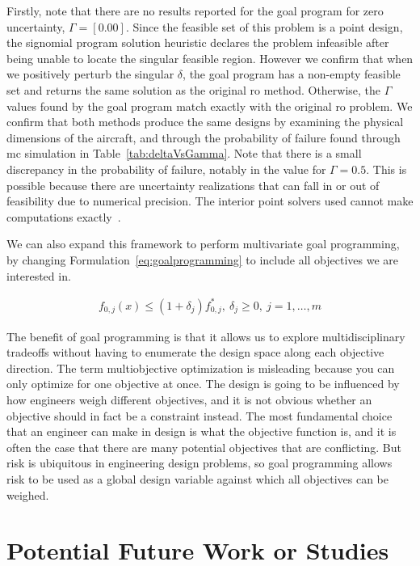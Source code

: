 Firstly, note that there are no results reported for the goal program
for zero uncertainty, $\Gamma = [0.00]$.
Since the feasible set of this problem is a point design, the signomial program
solution heuristic declares the problem infeasible after being
unable to locate the singular feasible region. However we confirm that when we positively perturb
the singular $\delta$, the goal program has a non-empty feasible set and
returns the same solution as the original \gls{ro} method.
Otherwise, the $\Gamma$ values found by the goal program match exactly
with the original \gls{ro} problem. We confirm that both methods produce
the same designs by examining the physical dimensions of the aircraft, and through the probability
of failure found through \gls{mc} simulation in Table~\ref{tab:deltaVsGamma}.
Note that there is a small discrepancy
in the probability of failure, notably in the value for $\Gamma = 0.5$. This is
possible because there are uncertainty realizations that can fall
in or out of feasibility due to numerical precision. The interior point solvers
used cannot make computations exactly~\cite{Nesterov1994}.

We can also expand this framework to perform multivariate goal programming,
by changing Formulation~\ref{eq:goalprogramming} to include all
objectives we are interested in.

\begin{align*}
    f_{0,j}(x) \leq (1+\delta_j) f^*_{0,j},~\delta_j \geq 0,~j = 1,\ldots, m
    \label{eq:multigoal}
\end{align*}

The benefit of goal programming is that it allows us to explore multidisciplinary tradeoffs without
having to enumerate the design space along each objective direction.
The term multiobjective optimization is misleading
because you can only optimize for one objective at once.
The design is going to be influenced by how engineers weigh different objectives, and
it is not obvious whether an objective should in fact be a constraint instead. The most
fundamental choice that an engineer can make in design is what the objective function is, and it is
often the case that there are many potential objectives that are conflicting.
But risk is ubiquitous in engineering design problems, so goal programming allows risk to be used as
a global design variable against which all objectives can be weighed.

\section{Potential Future Work or Studies}

